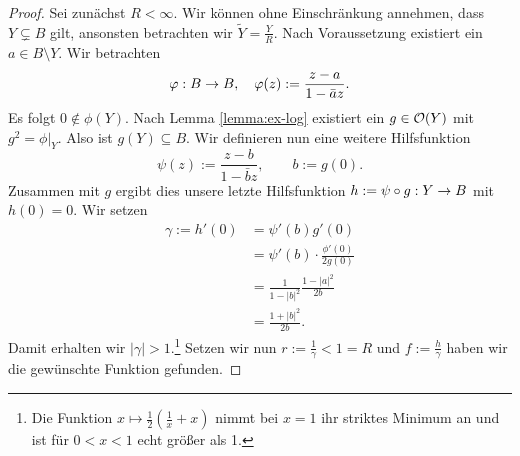 \begin{proof}
  Sei zunächst $R < \infty$. Wir können ohne Einschränkung annehmen,
  dass $Y \subsetneq B$ gilt, ansonsten betrachten wir $\tilde Y =
  \frac{Y}{R}$. Nach Voraussetzung existiert ein $a \in B \setminus
  Y$. Wir betrachten
  \[
  \varphi: B \rightarrow B, \quad \varphi(z) := \frac{z-a}{1-\bar a z}.
  \]
  Es folgt $0 \notin \phi(Y)$. Nach Lemma \ref{lemma:ex-log} existiert ein
  $g \in \mathcal{O}(Y)$ mit $g^2 = \phi|_Y$. Also ist $g(Y) \subseteq
  B$. Wir definieren nun eine weitere Hilfsfunktion
  \[
  \psi(z) := \frac{z-b}{1 - \bar b z}, \qquad b:= g(0).
  \]
  Zusammen mit $g$ ergibt dies unsere letzte Hilfsfunktion $h :=
  \psi \circ g: Y \rightarrow B$ mit $h(0) = 0$. Wir setzen
  \begin{align*}
    \gamma := h'(0) & = \psi'(b) g'(0) \\
    & = \psi'(b) \cdot \frac{\phi'(0)}{2 g(0)} \\
    & = \frac{1}{1-|b|^2} \frac{1-|a|^2}{2b} \\
    & = \frac{1 + |b|^2}{2b}.
  \end{align*}
  Damit erhalten wir $|\gamma| > 1$.\footnote{Die Funktion $x \mapsto
    \frac12 \left ( \frac1x + x \right )$ nimmt bei $x = 1$ ihr
    striktes Minimum an und ist für $0 < x< 1$ echt größer als 1.} Setzen
  wir nun $r := \frac{1}{\gamma} < 1 = R$ und $f :=
  \frac{h}{\gamma}$ haben wir die gewünschte Funktion gefunden.


\end{proof}
